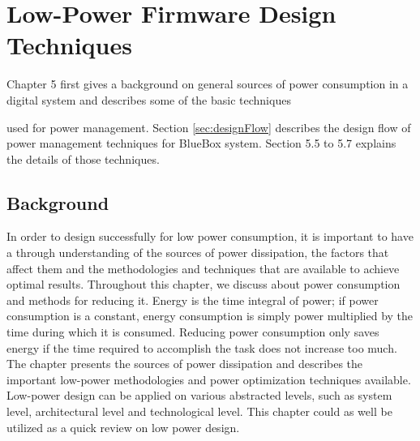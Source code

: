 \chapter{Low-Power Firmware Design Techniques}

Chapter 5 first gives a background on general sources of power
consumption in a digital system and describes some of the basic
techniques

used for power management. Section \ref{sec:designFlow} describes the design flow of
power management techniques for BlueBox system. Section 5.5 to 5.7
explains the details of those techniques.  

\section{Background}

In order to design successfully for low power consumption, it is important to have a through understanding of the sources of power dissipation, the factors that affect them and the methodologies and techniques that are available to achieve optimal results. 
Throughout this chapter, we discuss about power consumption and methods for reducing it. Energy is the time integral of power; if power consumption is a constant, energy consumption is simply power multiplied by the time during which it is consumed. Reducing power consumption only saves energy if the time required to accomplish the task does not increase too much. The chapter presents the sources of power dissipation and describes the important low-power methodologies and power optimization techniques available. Low-power design can be applied on various abstracted levels, such as system level, architectural level and technological level. This chapter could as well be utilized as a quick review on low power design. 

